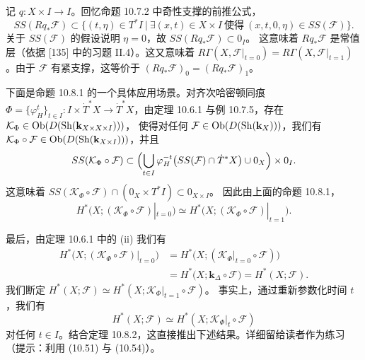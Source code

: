\begin{wproof}
  记 $q\colon X\times I\to I$。回忆命题 10.7.2 中奇性支撑的前推公式，
  \[
    SS(Rq_*\mathcal F)\subset\bigl\{(t,\eta)\in T^*I\ \big|\
    \exists(x,t)\in X\times I\ \text{使得}\ (x,t,0,\eta)\in SS(\mathcal F)\bigr\}.
  \]
  关于 $SS(\mathcal F)$ 的假设说明 $\eta=0$，故 $SS(Rq_*\mathcal F)\subset0_I$。
  这意味着 $Rq_*\mathcal F$ 是常值层（依据 [135] 中的习题 II.4）。这又意味着
  $R\Gamma(X,\mathcal F|_{t=0})=R\Gamma(X,\mathcal F|_{t=1})$。由于
  $\mathcal F$ 有紧支撑，这等价于 $(Rq_*\mathcal F)_0=(Rq_*\mathcal F)_1$。
\end{wproof}


下面是命题 10.8.1 的一个具体应用场景。对齐次哈密顿同痕
$\Phi=\{\varphi_H^t\}_{t\in I}\colon I\times\dot T^*X\to\dot T^*X$，由定理
10.6.1 与例 10.7.5，存在
$\mathcal K_\Phi\in\operatorname{Ob}(D(\operatorname{Sh}(\mathbf{k}_{X\times X\times I})))$，
使得对任何 $\mathcal F\in\operatorname{Ob}(D(\operatorname{Sh}(\mathbf{k}_X)))$，我们有
$\mathcal K_\Phi\circ\mathcal F
\in\operatorname{Ob}(D(\operatorname{Sh}(\mathbf{k}_{X\times I})))$，并且
\[
  SS(\mathcal K_\Phi\circ\mathcal F)\subset
  \Bigl(\bigcup_{t\in I}\varphi_H^{-t}\bigl(SS(\mathcal F)\cap\dot T^*X\bigr)
  \cup0_X\Bigr)\times0_I.
\]
这意味着
$SS(\mathcal K_\Phi\circ\mathcal F)\cap(0_X\times T^*I)\subset0_{X\times I}$。
因此由上面的命题 10.8.1，
\[
  H^*\bigl(X;(\mathcal K_\Phi\circ\mathcal F)|_{t=0}\bigr)
  \simeq H^*\bigl(X;(\mathcal K_\Phi\circ\mathcal F)|_{t=1}\bigr).
\]

最后，由定理 10.6.1 中的 (ii) 我们有
\[
  \begin{aligned}
    H^*\bigl(X;(\mathcal K_\Phi\circ\mathcal F)|_{t=0}\bigr)
    &=H^*\bigl(X;(\mathcal K_\Phi|_{t=0}\circ\mathcal F)\bigr)\\
    &=H^*\bigl(X;\mathbf{k}_\Delta\circ\mathcal F\bigr)
    =H^*(X;\mathcal F).
  \end{aligned}
\]
我们断定
$H^*(X;\mathcal F)\simeq H^*(X;\mathcal K_\Phi|_{t=1}\circ\mathcal F)$。
事实上，通过重新参数化时间 $t$，我们有
\begin{equation}\tag{10.54}
  H^*(X;\mathcal F)\simeq H^*(X;\mathcal K_\Phi|_t\circ\mathcal F)
\end{equation}
对任何 $t\in I$。结合定理 10.8.2，这直接推出下述结果。详细留给读者作为练习
（提示：利用 (10.51) 与 (10.54)）。

